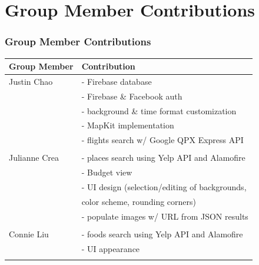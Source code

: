 \documentclass{beamer}
\begin{document}
\section{Group Member Contributions}
\begin{frame}
\frametitle{Group Member Contributions}
    \begin{tabular}{l|l}
        Group Member & Contribution \\
        \hline
        Justin Chao & - Firebase database \\
         & - Firebase \& Facebook auth \\
         & - background \& time format customization \\
         & - MapKit implementation \\
         & - flights search w/ Google QPX Express API \\
         &  \\

        Julianne Crea & - places search using Yelp API and Alamofire \\ 
         & - Budget view \\
         & - UI design (selection/editing of backgrounds, \\ 
         & \hspace{10mm} color scheme, rounding corners) \\
         & - populate images w/ URL from JSON results \\
         &  \\
         
        Connie Liu & - foods search using Yelp API and Alamofire \\
         & - UI appearance \\
         &  \\

    \end{tabular}
\end{frame}
\end{document}
